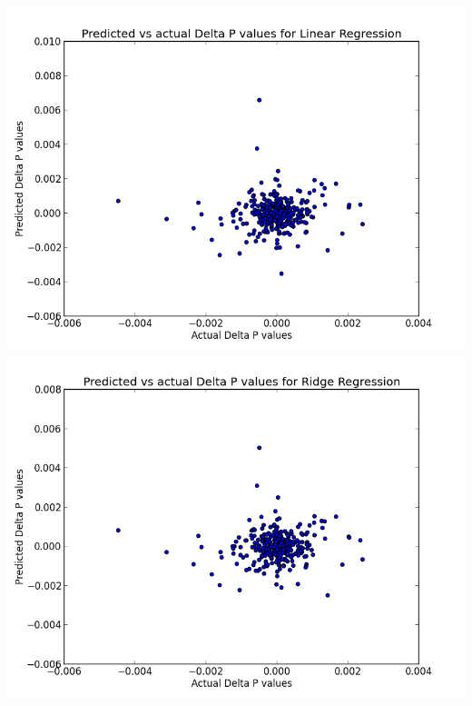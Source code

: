 \documentclass[10pt]{article}
\begin{document}
\includegraphics[scale=0.44]{linearregression.png}\\
\includegraphics[scale=0.44]{ridgeregression.png}\\
 
\end{document}
